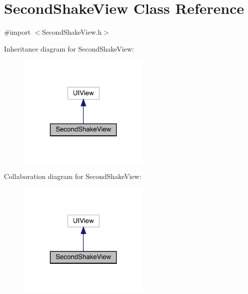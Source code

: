 \hypertarget{interface_second_shake_view}{}\section{Second\+Shake\+View Class Reference}
\label{interface_second_shake_view}


{\ttfamily \#import $<$Second\+Shake\+View.\+h$>$}



Inheritance diagram for Second\+Shake\+View\+:\nopagebreak
\begin{figure}[H]
\begin{center}
\leavevmode
\includegraphics[width=180pt]{interface_second_shake_view__inherit__graph}
\end{center}
\end{figure}


Collaboration diagram for Second\+Shake\+View\+:\nopagebreak
\begin{figure}[H]
\begin{center}
\leavevmode
\includegraphics[width=180pt]{interface_second_shake_view__coll__graph}
\end{center}
\end{figure}

